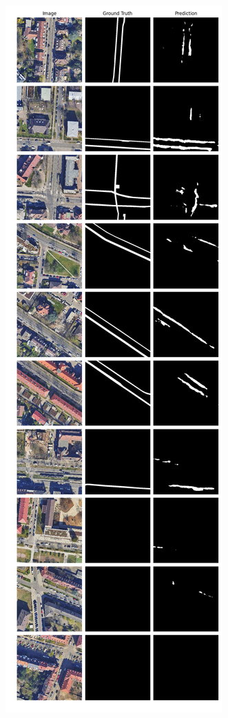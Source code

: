 	\begin{figure}
	\centering
	\begin{subfigure}{.4\textwidth}
		\centering
		\includegraphics[width=1.\textwidth]{Bilder/Samples-KA/vbunet-s.png} 

\end{subfigure}
\end{figure}
